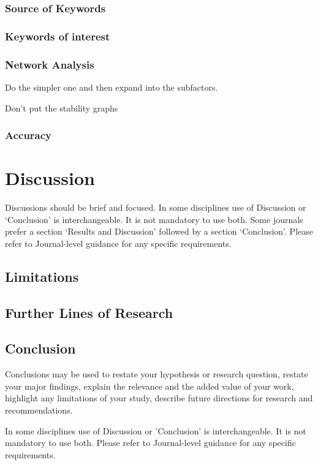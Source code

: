 \documentclass[sn-mathphys, Numbered]{sn-jnl}%
\theoremstyle{thmstyleone}%
\theoremstyle{thmstyletwo}%
\theoremstyle{thmstylethree}%
\begin{document}
\subsubsection*{Source of Keywords}

\subsubsection*{Keywords of interest}

\subsubsection*{Network Analysis}

Do the simpler one and then expand into the subfactors.

Don't put the stability graphs

\subsubsection*{Accuracy}





\section{Discussion}\label{Discussion}

Discussions should be brief and focused. In some disciplines use of Discussion or `Conclusion' is interchangeable. It is not mandatory to use both. Some journals prefer a section `Results and Discussion' followed by a section `Conclusion'. Please refer to Journal-level guidance for any specific requirements. 


\subsection{Limitations}\label{Limitations}

\subsection{Further Lines of Research}\label{Further Lines of Research}

\subsection{Conclusion}\label{Conclusion}

Conclusions may be used to restate your hypothesis or research question, restate your major findings, explain the relevance and the added value of your work, highlight any limitations of your study, describe future directions for research and recommendations. 

In some disciplines use of Discussion or 'Conclusion' is interchangeable. It is not mandatory to use both. Please refer to Journal-level guidance for any specific requirements. 


\printbibliography
\end{document}
